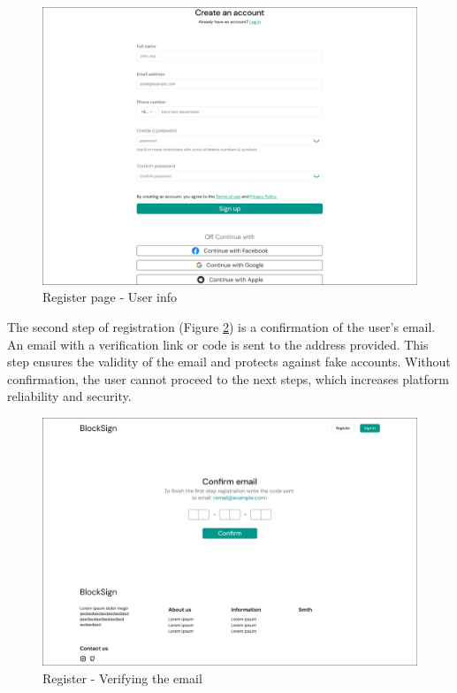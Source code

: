 \begin{figure}[H]
    \centering
    \includegraphics[width=18cm]{"images/figmaUI/register1-crop.png"}
    \caption{Register page - User info}
    \label{register}
\end{figure}

\newpage
The second step of registration (Figure \ref{registerstep2}) is a confirmation of the user's email. 
An email with a verification link or code is sent to the address provided. 
This step ensures the validity of the email and protects against fake accounts. 
Without confirmation, the user cannot proceed to the next steps, which increases platform reliability and security. 

\begin{figure}[H]
    \centering
    \includegraphics[width=18cm]{"images/figmaUI/registerstep2.png"}
    \caption{Register - Verifying the email}
    \label{registerstep2}
\end{figure}

